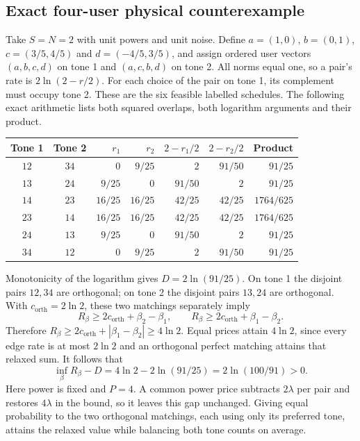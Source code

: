 \documentclass[10pt,letterpaper]{article}
\begin{document}
\subsection{Exact four-user physical counterexample}
Take $S=N=2$ with unit powers and unit noise. Define
$a=(1,0)$, $b=(0,1)$, $c=(3/5,4/5)$ and $d=(-4/5,3/5)$, and assign ordered user vectors $(a,b,c,d)$ on tone 1 and $(a,c,b,d)$ on tone 2. All norms equal one, so a pair's rate is $2\ln(2-r/2)$. For each choice of the pair on tone 1, its complement must occupy tone 2. These are the six feasible labelled schedules. The following exact arithmetic lists both squared overlaps, both logarithm arguments and their product.
\begin{center}
\setlength{\tabcolsep}{7pt}
\begin{tabular}{ccrrrrr}
Tone 1 & Tone 2 & $r_1$ & $r_2$ & $2-r_1/2$ & $2-r_2/2$ & Product\\ \hline
$12$ & $34$ & $0$ & $9/25$ & $2$ & $91/50$ & $91/25$\\
$13$ & $24$ & $9/25$ & $0$ & $91/50$ & $2$ & $91/25$\\
$14$ & $23$ & $16/25$ & $16/25$ & $42/25$ & $42/25$ & $1764/625$\\
$23$ & $14$ & $16/25$ & $16/25$ & $42/25$ & $42/25$ & $1764/625$\\
$24$ & $13$ & $9/25$ & $0$ & $91/50$ & $2$ & $91/25$\\
$34$ & $12$ & $0$ & $9/25$ & $2$ & $91/50$ & $91/25$
\end{tabular}
\end{center}
Monotonicity of the logarithm gives $D=2\ln(91/25)$. On tone 1 the disjoint pairs $12,34$ are orthogonal; on tone 2 the disjoint pairs $13,24$ are orthogonal. With $c_{\mathrm{orth}}=2\ln2$, these two matchings separately imply
\begin{equation}
 R_\beta\ge2c_{\mathrm{orth}}+\beta_2-\beta_1,
 \qquad R_\beta\ge2c_{\mathrm{orth}}+\beta_1-\beta_2.
 \label{supp:four-user-prices}
\end{equation}
Therefore $R_\beta\ge2c_{\mathrm{orth}}+|\beta_1-\beta_2|\ge4\ln2$. Equal prices attain $4\ln2$, since every edge rate is at most $2\ln2$ and an orthogonal perfect matching attains that relaxed sum. It follows that
\begin{equation}
 \inf_\beta R_\beta-D=4\ln2-2\ln(91/25)=2\ln(100/91)>0.
 \label{supp:four-user-gap}
\end{equation}
Here power is fixed and $P=4$. A common power price subtracts $2\lambda$ per pair and restores $4\lambda$ in the bound, so it leaves this gap unchanged. Giving equal probability to the two orthogonal matchings, each using only its preferred tone, attains the relaxed value while balancing both tone counts on average.
\end{document}
